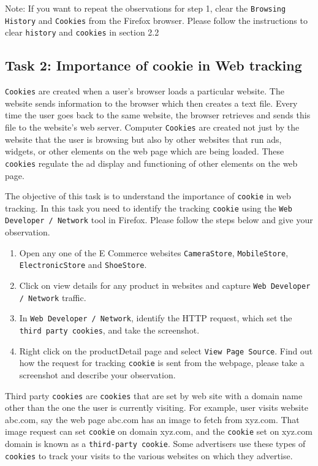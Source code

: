 Note: If you want to repeat the observations for step 1, clear the {\tt Browsing History} and {\tt Cookies} from the Firefox browser.
Please follow the instructions to clear {\tt history} and {\tt cookies} in section 2.2

\subsection{Task 2: Importance of cookie in Web tracking}

{\tt Cookies} are created when a user's browser loads a particular website. The website sends information to the browser which then creates a text file. 
Every time the user goes back to the same website, the browser retrieves and sends this file to the website's web server. 
Computer {\tt Cookies} are created not just by the website that the user is browsing but also by other websites that run ads, widgets, or other elements on the web page which are being loaded. 
These {\tt cookies} regulate the ad display and functioning of other elements on the web page.

The objective of this task is to understand the importance of {\tt cookie} in web tracking. 
In this task you need to identify the tracking {\tt cookie} using the {\tt Web Developer / Network} tool in Firefox. 
Please follow the steps below and give your observation.

\begin{enumerate}
  \item Open any one of the E Commerce websites {\tt CameraStore}, {\tt MobileStore}, {\tt ElectronicStore} and {\tt ShoeStore}.
  \item Click on view details for any product in websites and capture {\tt Web Developer / Network} traffic.
  \item In {\tt Web Developer / Network}, identify the HTTP request, which set the {\tt third party cookies}, and take the screenshot.
  \item Right click on the productDetail page and select {\tt View Page Source}. Find out how the request for tracking {\tt cookie} is sent from the webpage, please take a screenshot and describe your observation.
\end{enumerate}

Third party {\tt cookies} are {\tt cookies} that are set by web site with a domain name other than the one the user is currently visiting. 
For example, user visits website abc.com, say the web page abc.com has an image to fetch from xyz.com. 
That image request can set {\tt cookie} on domain xyz.com, and the {\tt cookie} set on xyz.com domain is known as a {\tt third-party cookie}. 
Some advertisers use these types of {\tt cookies} to track your visits to the various websites on which they advertise.

